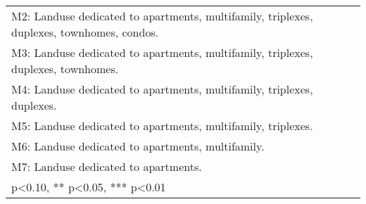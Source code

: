 \begin{table}[htbp]
\begin{tabular}{l*{8}{c}}
\multicolumn{9}{l}{\footnotesize M2: Landuse dedicated to apartments, multifamily, triplexes, duplexes, townhomes, condos.}\\
\multicolumn{9}{l}{\footnotesize M3: Landuse dedicated to apartments, multifamily, triplexes, duplexes, townhomes.}\\
\multicolumn{9}{l}{\footnotesize M4: Landuse dedicated to apartments, multifamily, triplexes, duplexes.}\\
\multicolumn{9}{l}{\footnotesize M5: Landuse dedicated to apartments, multifamily, triplexes.}\\
\multicolumn{9}{l}{\footnotesize M6: Landuse dedicated to apartments, multifamily.}\\
\multicolumn{9}{l}{\footnotesize M7: Landuse dedicated to apartments.}\\
\multicolumn{9}{l}{\footnotesize * p<0.10, ** p<0.05, *** p<0.01}\\
\end{tabular}
\end{table}
